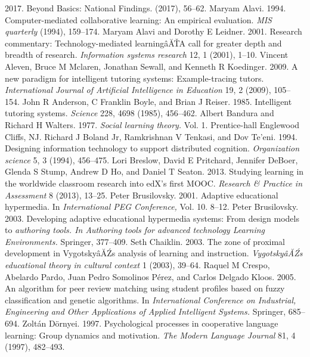 \begin{multicols}{2}
\begin{thebibliography}{99}
 2017. Beyond Basics: National Findings. (2017), 56–62.
 Maryam Alavi. 1994. Computer-mediated collaborative learning: An empirical evaluation. \textit{MIS quarterly} (1994), 159–174.
 Maryam Alavi and Dorothy E Leidner. 2001. Research commentary: Technology-mediated learningâĂŤA call for greater depth and breadth of research. \textit{Information systems research} 12, 1 (2001), 1–10.
 Vincent Aleven, Bruce M Mclaren, Jonathan Sewall, and Kenneth R Koedinger. 2009. A new paradigm for intelligent tutoring systems: Example-tracing tutors. \textit{International Journal of Artificial Intelligence in Education} 19, 2 (2009), 105–154.
 John R Anderson, C Franklin Boyle, and Brian J Reiser. 1985. Intelligent tutoring systems. \textit{Science} 228, 4698 (1985), 456–462.
 Albert Bandura and Richard H Walters. 1977. \textit{Social learning theory.} Vol. 1. Prentice-hall Englewood Cliffs, NJ.
 Richard J Boland Jr, Ramkrishnan V Tenkasi, and Dov Te’eni. 1994. Designing information technology to support distributed cognition. \textit{Organization science} 5, 3 (1994), 456–475.
 Lori Breslow, David E Pritchard, Jennifer DeBoer, Glenda S Stump, Andrew D Ho, and Daniel T Seaton. 2013. Studying learning in the worldwide classroom research into edX’s first MOOC. \textit{Research \& Practice in Assessment} 8 (2013), 13–25.
 Peter Brusilovsky. 2001. Adaptive educational hypermedia. In \textit{International PEG Conference,} Vol. 10. 8–12.
 Peter Brusilovsky. 2003. Developing adaptive educational hypermedia systems: From design models to \textit{authoring tools. In Authoring tools for advanced technology Learning Environments.} Springer, 377–409.
 Seth Chaiklin. 2003. The zone of proximal development in VygotskyâĂŹs analysis of learning and instruction. \textit{VygotskyâĂŹs educational theory in cultural context} 1 (2003), 39–64.
 Raquel M Crespo, Abelardo Pardo, Juan Pedro Somolinos Pérez, and Carlos Delgado Kloos. 2005. An algorithm for peer review matching using student profiles based on fuzzy classification and genetic algorithms. In \textit{International Conference on Industrial, Engineering and Other Applications of Applied Intelligent Systems.} Springer, 685–694.
 Zoltán Dörnyei. 1997. Psychological processes in cooperative language learning: Group dynamics and motivation. \textit{The Modern Language Journal} 81, 4 (1997), 482–493.

\end{thebibliography}
\end{multicols}
